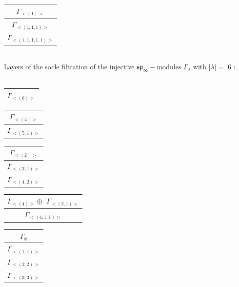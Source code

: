 \begin{minipage}{.33\textwidth}
\centering
\begin{tabular}{|c|}\hline
$\Gamma_{<(
1
)>}$
\\ \hline
$\Gamma_{<(
1 , 
1 , 
1
)>}$
\\ \hline
$\Gamma_{<(
1 , 
1 , 
1 , 
1 , 
1
)>}$
\\
\hline\end{tabular}\end{minipage}
\\




\bigskip
Layers of the socle filtration of the injective $\mathfrak{sp}_\infty-$modules $\Gamma_{\lambda}$ with $|\lambda| = $ 6 : \\\\
\begin{minipage}{.2\textwidth}
\centering
\begin{tabular}{|c|}\hline
$\Gamma_{<(
6
)>}$
\\
\hline\end{tabular}\end{minipage}
\begin{minipage}{.2\textwidth}
\centering
\begin{tabular}{|c|}\hline
$\Gamma_{<(
4
)>}$
\\ \hline
$\Gamma_{<(
5 , 
1
)>}$
\\
\hline\end{tabular}\end{minipage}
\begin{minipage}{.2\textwidth}
\centering
\begin{tabular}{|c|}\hline
$\Gamma_{<(
2
)>}$
\\ \hline
$\Gamma_{<(
3 , 
1
)>}$
\\ \hline
$\Gamma_{<(
4 , 
2
)>}$
\\
\hline\end{tabular}\end{minipage}
\begin{minipage}{.6\textwidth}
\centering
\begin{tabular}{|c|}\hline
$\Gamma_{<(
4
)>} \oplus$
$\Gamma_{<(
3 , 
1
)>}$
\\ \hline
$\Gamma_{<(
4 , 
1 , 
1
)>}$
\\
\hline\end{tabular}\end{minipage}
\bigskip
\begin{minipage}{.3\textwidth}
\centering
\begin{tabular}{|c|}\hline
$\Gamma_\emptyset$
\\ \hline
$\Gamma_{<(
1 , 
1
)>}$
\\ \hline
$\Gamma_{<(
2 , 
2
)>}$
\\ \hline
$\Gamma_{<(
3 , 
3
)>}$
\\
\hline\end{tabular}\end{minipage}
